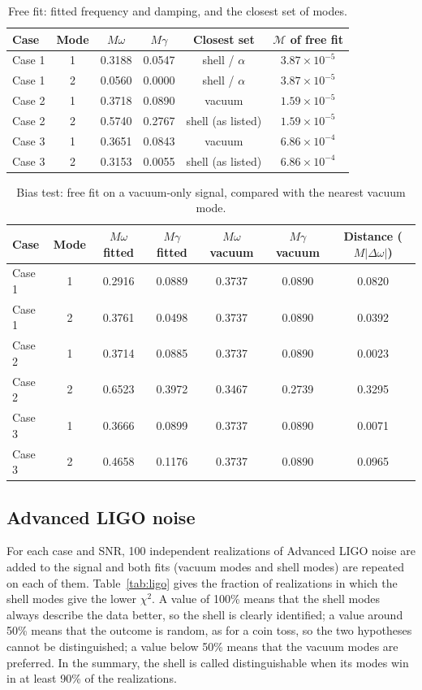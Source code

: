 \documentclass[11pt,a4paper]{article}
\begin{document}
\begin{table}[H]
\centering\small
\begin{tabular}{lccccc}
\toprule
Case & Mode & $M\omega$ & $M\gamma$ & Closest set & $\mathcal{M}$ of free fit \\
\midrule
Case 1 & 1 & 0.3188 & 0.0547 & shell / $\alpha$ & $3.87\times10^{-5}$ \\
Case 1 & 2 & 0.0560 & 0.0000 & shell / $\alpha$ & $3.87\times10^{-5}$ \\
Case 2 & 1 & 0.3718 & 0.0890 & vacuum & $1.59\times10^{-5}$ \\
Case 2 & 2 & 0.5740 & 0.2767 & shell (as listed) & $1.59\times10^{-5}$ \\
Case 3 & 1 & 0.3651 & 0.0843 & vacuum & $6.86\times10^{-4}$ \\
Case 3 & 2 & 0.3153 & 0.0055 & shell (as listed) & $6.86\times10^{-4}$ \\
\bottomrule
\end{tabular}
\caption{Free fit: fitted frequency and damping, and the closest set of modes.}
\end{table}

\begin{table}[H]
\centering\small
\begin{tabular}{lcccccc}
\toprule
Case & Mode & $M\omega$ fitted & $M\gamma$ fitted & $M\omega$ vacuum & $M\gamma$ vacuum & Distance ($M|\Delta\omega|$) \\
\midrule
Case 1 & 1 & 0.2916 & 0.0889 & 0.3737 & 0.0890 & 0.0820 \\
Case 1 & 2 & 0.3761 & 0.0498 & 0.3737 & 0.0890 & 0.0392 \\
Case 2 & 1 & 0.3714 & 0.0885 & 0.3737 & 0.0890 & 0.0023 \\
Case 2 & 2 & 0.6523 & 0.3972 & 0.3467 & 0.2739 & 0.3295 \\
Case 3 & 1 & 0.3666 & 0.0899 & 0.3737 & 0.0890 & 0.0071 \\
Case 3 & 2 & 0.4658 & 0.1176 & 0.3737 & 0.0890 & 0.0965 \\
\bottomrule
\end{tabular}
\caption{Bias test: free fit on a vacuum-only signal, compared with the nearest vacuum mode.}
\end{table}

\subsection{Advanced LIGO noise}
For each case and SNR, 100 independent
realizations of Advanced LIGO noise are added to the signal and both fits (vacuum modes and shell modes) are
repeated on each of them. Table~\ref{tab:ligo} gives the fraction of realizations in which the shell modes give the
lower $\chi^2$. A value of 100\% means that the shell modes always describe the data better, so the shell is
clearly identified; a value around 50\% means that the outcome is random, as for a coin toss, so the two
hypotheses cannot be distinguished; a value below 50\% means that the vacuum modes are preferred. In the summary,
the shell is called distinguishable when its modes win in at least 90\% of the realizations.
\end{document}
